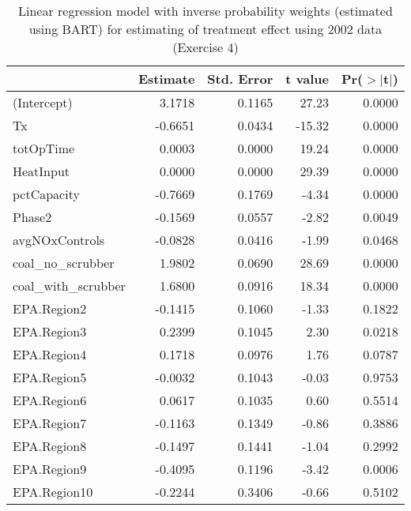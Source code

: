 \begin{table}[ht]
\centering
\begin{tabular}{lrrrr}
  \toprule
 & Estimate & Std. Error & t value & Pr($>$$|$t$|$) \\ 
  \midrule
(Intercept) & 3.1718 & 0.1165 & 27.23 & 0.0000 \\ 
  Tx & -0.6651 & 0.0434 & -15.32 & 0.0000 \\ 
  totOpTime & 0.0003 & 0.0000 & 19.24 & 0.0000 \\ 
  HeatInput & 0.0000 & 0.0000 & 29.39 & 0.0000 \\ 
  pctCapacity & -0.7669 & 0.1769 & -4.34 & 0.0000 \\ 
  Phase2 & -0.1569 & 0.0557 & -2.82 & 0.0049 \\ 
  avgNOxControls & -0.0828 & 0.0416 & -1.99 & 0.0468 \\ 
  coal\_no\_scrubber & 1.9802 & 0.0690 & 28.69 & 0.0000 \\ 
  coal\_with\_scrubber & 1.6800 & 0.0916 & 18.34 & 0.0000 \\ 
  EPA.Region2 & -0.1415 & 0.1060 & -1.33 & 0.1822 \\ 
  EPA.Region3 & 0.2399 & 0.1045 & 2.30 & 0.0218 \\ 
  EPA.Region4 & 0.1718 & 0.0976 & 1.76 & 0.0787 \\ 
  EPA.Region5 & -0.0032 & 0.1043 & -0.03 & 0.9753 \\ 
  EPA.Region6 & 0.0617 & 0.1035 & 0.60 & 0.5514 \\ 
  EPA.Region7 & -0.1163 & 0.1349 & -0.86 & 0.3886 \\ 
  EPA.Region8 & -0.1497 & 0.1441 & -1.04 & 0.2992 \\ 
  EPA.Region9 & -0.4095 & 0.1196 & -3.42 & 0.0006 \\ 
  EPA.Region10 & -0.2244 & 0.3406 & -0.66 & 0.5102 \\ 
   \bottomrule
\end{tabular}
\caption{Linear regression model with inverse probability weights (estimated using BART) for estimating of treatment effect using 2002 data (Exercise 4)} 
\label{tab:lm-2g-02}
\end{table}

